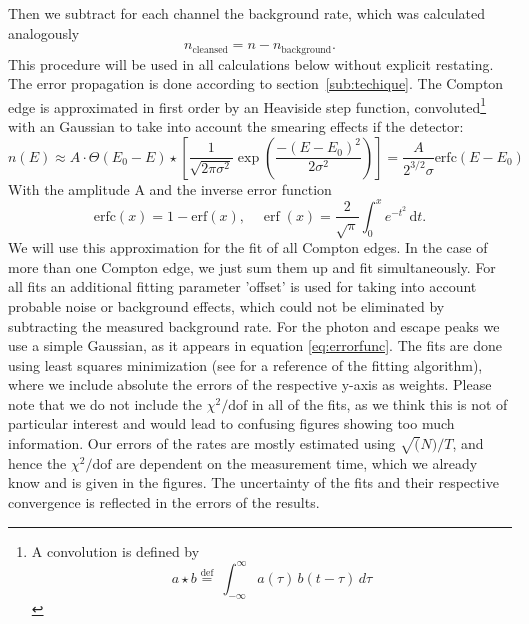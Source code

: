 Then we subtract for each channel the background rate, which
was calculated analogously 
\begin{equation}
    n_\mathrm{cleansed} = n - n_\mathrm{background}.
    \label{eq:rate2}
\end{equation}
This procedure will be used in all calculations below without explicit restating. 
The error propagation is done according to section~\ref{sub:techique}.
The Compton edge is approximated in first order by an Heaviside step function,
convoluted\footnote{ 
    A convolution is defined by
\begin{equation}
    a \star b   \stackrel{\mathrm{def}}{=}\ \int_{-\infty}^\infty a(\tau)\, b(t - \tau)\, d\tau 	
    \label{eq:conv}
\end{equation}

} with an Gaussian to take into account the smearing
effects if the detector:
\begin{equation}
    n(E)  \approx A\cdot \Theta(E_0 - E) \star  	
    \left[  \frac{1}{\sqrt{2\pi\sigma^2}} \exp \left( 
        \frac{-(E-E_0)^2}{2\sigma^2}\right)
        \right]  =\frac{A}{2^{3/2}\sigma} 
    \mathrm{erfc}(E - E_0) 
    \label{eq:errorfunc}
\end{equation}
With the amplitude A and the inverse error function
\begin{equation}
    \mathrm{erfc}(x) = 1 - \mathrm{erf}(x) , \quad
    \operatorname{erf}(x) = 
    \frac{2}{\sqrt\pi}\int_0^x e^{-t^2}\,\mathrm dt. 
    \label{eq:erfc}
\end{equation}
We will use this approximation for the fit of all Compton 
edges. In the case of more than one Compton edge, we just
sum them up and fit simultaneously. For all fits an additional fitting parameter 'offset'
is used for taking into account probable noise or background
effects, which could not be eliminated by subtracting the 
measured background rate. For the photon and escape peaks we use 
a simple Gaussian, as it appears in equation \eqref{eq:errorfunc}.
The fits are done using least squares minimization (see 
\cite{scipy} for a reference of the fitting algorithm), where 
we include absolute the errors of the respective y-axis as 
weights. Please note
that we do not include the $\chi^2/\mathrm{dof}$ in all of the fits,
as we think this is not of particular interest and would lead
to confusing figures showing too much information. Our errors
of the rates are mostly estimated using $\sqrt(N)/T$, and hence
the $\chi^2/\mathrm{dof}$ are dependent 
on the measurement time, which we already know and
is given in the figures. The uncertainty of the fits and their
respective convergence is reflected in the errors of the 
results. 

